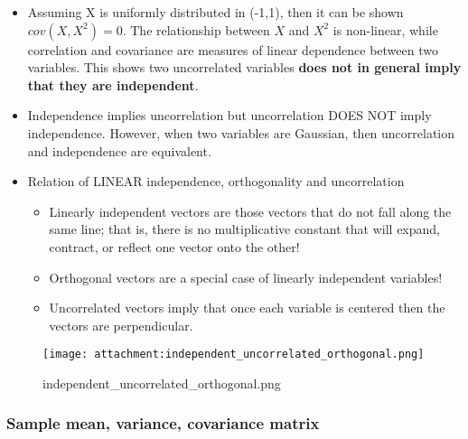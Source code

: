 \documentclass[11pt]{article}
\makeatletter
\def\maxwidth{\ifdim\Gin@nat@width>\linewidth\linewidth
    \else\Gin@nat@width\fi}
\let\Oldincludegraphics\includegraphics
\renewcommand{\includegraphics}[1]{\Oldincludegraphics[width=.8\maxwidth]{#1}}
\makeatother
\begin{document}
\begin{itemize}
\item
  Assuming X is uniformly distributed in (-1,1), then it can be shown
  \(cov(X,X^2) = 0\). The relationship between \(X\) and \(X^2\) is
  non-linear, while correlation and covariance are measures of linear
  dependence between two variables. This shows two uncorrelated
  variables \textbf{does not in general imply that they are
  independent}.
\item
  Independence implies uncorrelation but uncorrelation DOES NOT imply
  independence. However, when two variables are Gaussian, then
  uncorrelation and independence are equivalent.
\item
  Relation of LINEAR independence, orthogonality and uncorrelation

  \begin{itemize}
  \item
    Linearly independent vectors are those vectors that do not fall
    along the same line; that is, there is no multiplicative constant
    that will expand, contract, or reflect one vector onto the other!
  \item
    Orthogonal vectors are a special case of linearly independent
    variables!
  \item
    Uncorrelated vectors imply that once each variable is centered then
    the vectors are perpendicular.
  \end{itemize}
\end{itemize}

    \begin{figure}
\centering
\texttt{[image: attachment:independent\_uncorrelated\_orthogonal.png]}
\caption{independent\_uncorrelated\_orthogonal.png}
\end{figure}

    \subsubsection{Sample mean, variance, covariance
matrix}\label{sample-mean-variance-covariance-matrix}
\end{document}
